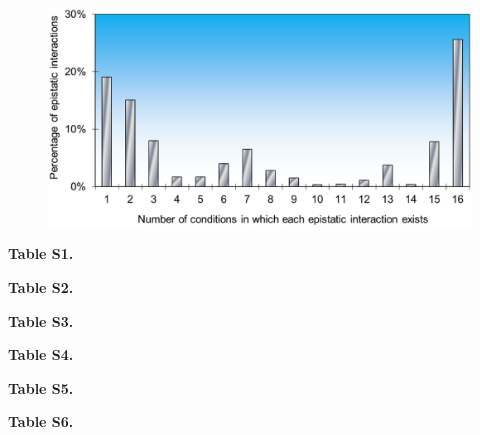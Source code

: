 \documentclass[letterpaper]{article}
\begin{document}
\begin{figure}[!htb]
\centering
\includegraphics[width=\textwidth]{envFigure_S4}
\caption{\eeFBAfigSFourCap}
\label{fig:eefS4}
\end{figure}

\noindent\textbf{Table S1.} 
\eeFBATabSOneCap

\hspace{1ex}

\noindent\textbf{Table S2.} 
\eeFBATabSTwoCap

\hspace{1ex}

\noindent\textbf{Table S3.} 
\eeFBATabSThreeCap

\hspace{1ex}

\noindent\textbf{Table S4.}
\eeFBATabSFourCap

\hspace{1ex}

\noindent\textbf{Table S5.}
\eeFBATabSFiveCap

\hspace{1ex}

\noindent\textbf{Table S6.}
\eeFBATabSSixCap

\clearpage


\end{document}
